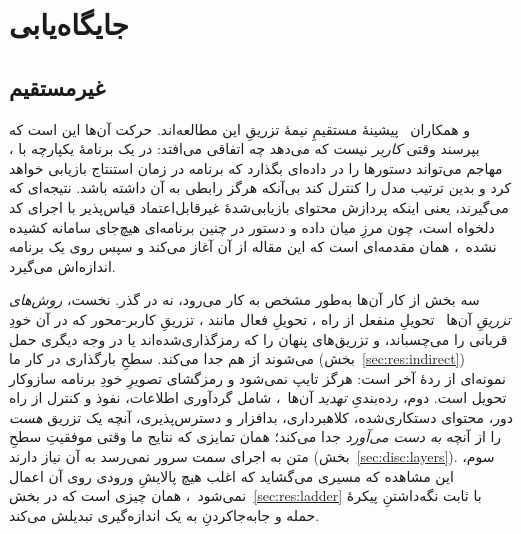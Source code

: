 %
\section{جایگاه‌یابی}
\label{sec:related}

\subsection{ غیرمستقیم}
\label{sec:rel:injection}

 و همکاران~\cite{greshake2023} پیشینهٔ مستقیمِ نیمهٔ تزریقِ
این مطالعه‌اند. حرکت آن‌ها این است که بپرسند وقتی \emph{کاربر} نیست که
 می‌دهد چه اتفاقی می‌افتد: در یک برنامهٔ یکپارچه با ،
مهاجم می‌تواند دستورها را در داده‌ای بگذارد که برنامه در زمان استنتاج
بازیابی خواهد کرد و بدین ترتیب مدل را کنترل کند بی‌آنکه هرگز رابطی به آن
داشته باشد. نتیجه‌ای که می‌گیرند، یعنی اینکه پردازش محتوای بازیابی‌شدهٔ
غیرقابل‌اعتماد قیاس‌پذیر با اجرای کد دلخواه است، چون مرزِ میان داده و
دستور در چنین برنامه‌ای هیچ‌جای سامانه کشیده
نشده~\cite[]{greshake2023}، همان مقدمه‌ای است که این مقاله از
آن آغاز می‌کند و سپس روی یک برنامه اندازه‌اش می‌گیرد.

سه بخش از کار آن‌ها به‌طور مشخص به کار می‌رود، نه در گذر. نخست،
\emph{روش‌های تزریقِ} آن‌ها~\cite[]{greshake2023} تحویلِ
منفعل از راه ، تحویلِ فعال مانند ، تزریقِ
کاربر-محور که در آن خودِ قربانی  را می‌چسباند، و تزریق‌های
پنهان را که رمزگذاری‌شده‌اند یا در وجه دیگری حمل می‌شوند از هم جدا می‌کند.
سطحِ بارگذاری  در کار ما (بخش~\ref{sec:res:indirect}) نمونه‌ای از
ردهٔ آخر است:  هرگز تایپ نمی‌شود و رمزگشای تصویرِ خودِ برنامه
سازوکار تحویل است. دوم، رده‌بندیِ \emph{تهدید}
آن‌ها~\cite[]{greshake2023}، شامل گردآوری اطلاعات، نفوذ و
کنترل از راه دور، محتوای دستکاری‌شده، کلاهبرداری، بدافزار و
دسترس‌پذیری، آنچه یک تزریق \emph{هست} را از آنچه \emph{به دست می‌آورد}
جدا می‌کند؛ همان تمایزی که نتایج ما وقتی موفقیتِ سطحِ متن به اجرای سمت
سرور نمی‌رسد به آن نیاز دارند (بخش~\ref{sec:disc:layers}). سوم، این
مشاهده که  مسیری می‌گشاید که اغلب هیچ پالایشِ ورودی روی آن
اعمال نمی‌شود~\cite[]{greshake2023}، همان چیزی است که
 در بخش~\ref{sec:res:ladder} با ثابت نگه‌داشتنِ
پیکرهٔ حمله و جابه‌جاکردنِ  به یک اندازه‌گیری تبدیلش می‌کند.

